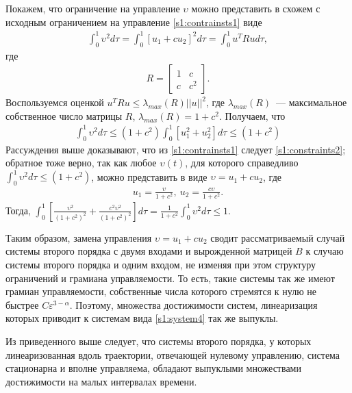 \documentclass[../main.tex]{subfiles}
\begin{document}
 
Покажем, что ограничение на управление $ \upsilon $  можно представить в схожем с исходным ограничением на управление \eqref{s1:contrainsts1} виде
\begin{gather*}
    \int_{0}^{1} \upsilon ^2 d \tau  = \int_{0}^{1} \left[ u_1 + c u_2 \right]^2 d \tau =  \int_{0}^{1} u^T  R u d \tau,
\end{gather*}
где 
\begin{gather*}
     R = \left[ \begin{array}{cc}
         1 & c \\ 
         c & c^2
     \end{array} \right].
\end{gather*}
Воспользуемся оценкой $
u^T R u \leqslant \lambda_{max}(R) || u ||^2 $, где $ \lambda_{max}(R) $~--- максимальное собственное число матрицы $ R $, $ \lambda_{max}(R)  = 1 + c^2 $.
Получаем, что
\begin{gather}\label{s1:constraints2}
    \int_{0}^{1} \upsilon ^2 d \tau \leqslant (1 + c^2) \int_{0}^{1} \left[ u_1^2 + u_2^2 \right] d \tau \leqslant (1 + c^2)
\end{gather}
Рассуждения выше доказывают, что из \eqref{s1:contrainsts1} следует \eqref{s1:constraints2}; обратное тоже верно, так как любое $ \upsilon(t) $, для которого справедливо $ \int_{0}^{1} \upsilon ^2 d \tau \leqslant (1 + c^2) $, можно представить в виде $ \upsilon = u_1 + c u_2 $, где 
\begin{gather*}
    u_1 = \frac{\upsilon}{1+c^2}, \ u_2 = \frac{c \upsilon}{1+c^2}.
\end{gather*}
Тогда, $ \int_0^1 \left[ \frac{\upsilon^2}{(1+c^2)^2} + \frac{c^2 \upsilon^2}{(1+c^2)^2}\right] d \tau = \frac{1}{1+c^2} \int_{0}^{1} \upsilon ^2 d \tau  \leqslant 1 $. 
 
Таким образом, замена управления $ \upsilon = u_1 + c u_2 $ сводит рассматриваемый случай системы второго порядка с двумя входами и вырожденной матрицей $ B $ к случаю системы второго порядка и одним входом, не изменяя при этом структуру ограничений и грамиана управляемости.
То есть, такие системы так же имеют грамиан управляемости, собственные числа которого стремятся к нулю не быстрее $ C \varepsilon^{3-\alpha} $.
Поэтому, множества достижимости систем, линеаризация которых приводит к системам вида \eqref{s1:system4} так же выпуклы.
 
Из приведенного выше следует, что системы второго порядка, у которых линеаризованная вдоль траектории, отвечающей нулевому управлению, система стационарна и вполне управляема,  обладают выпуклыми множествами достижимости на малых интервалах времени.
\end{document}
